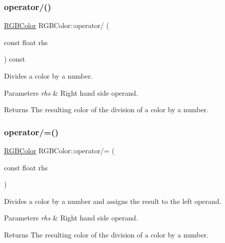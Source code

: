 \subsubsection{\texorpdfstring{operator/()}{operator/()}}
{\footnotesize\ttfamily \hyperlink{class_r_g_b_color}{R\+G\+B\+Color} R\+G\+B\+Color\+::operator/ (\begin{DoxyParamCaption}\item[{const float}]{rhs }\end{DoxyParamCaption}) const\hspace{0.3cm}{\ttfamily [inline]}}

Divides a color by a number. 
\begin{DoxyParams}{Parameters}
{\em rhs} & Right hand side operand. \\
\hline
\end{DoxyParams}
\begin{DoxyReturn}{Returns}
The resulting color of the division of a color by a number. 
\end{DoxyReturn}
\hypertarget{group___utilities_gad071890eadae01f96bf3af8ba52503e0}{}\label{group___utilities_gad071890eadae01f96bf3af8ba52503e0} 
\subsubsection{\texorpdfstring{operator/=()}{operator/=()}}
{\footnotesize\ttfamily \hyperlink{class_r_g_b_color}{R\+G\+B\+Color} R\+G\+B\+Color\+::operator/= (\begin{DoxyParamCaption}\item[{const float}]{rhs }\end{DoxyParamCaption})\hspace{0.3cm}{\ttfamily [inline]}}

Divides a color by a number and assigns the result to the left operand. 
\begin{DoxyParams}{Parameters}
{\em rhs} & Right hand side operand. \\
\hline
\end{DoxyParams}
\begin{DoxyReturn}{Returns}
The resulting color of the division of a color by a number. 
\end{DoxyReturn}
\hypertarget{group___utilities_ga51f2ca82bd3166f19e7327c8e5e5a068}{}\label{group___utilities_ga51f2ca82bd3166f19e7327c8e5e5a068} 
